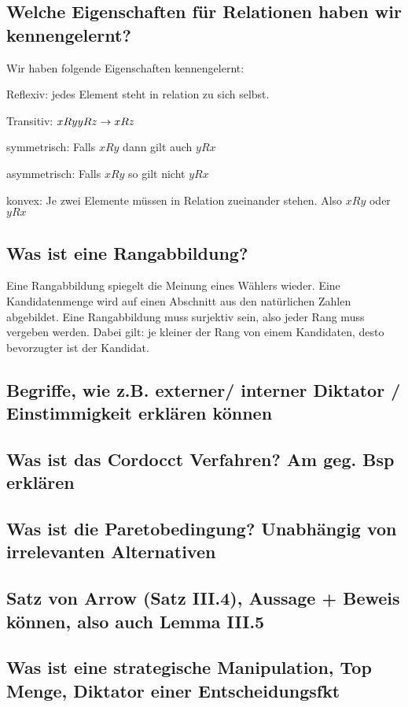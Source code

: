 \documentclass[]{article}
\begin{document}
\subsection*{Welche Eigenschaften für Relationen haben wir kennengelernt? }
Wir haben folgende Eigenschaften kennengelernt:
 
Reflexiv: jedes Element steht in relation zu sich selbst. 

Transitiv: $xRy \vspace{1ex} yRz \rightarrow xRz$

symmetrisch: Falls $xRy$ dann gilt auch $yRx$

asymmetrisch: Falls $xRy$ so gilt nicht $yRx$

konvex: Je zwei Elemente müssen in Relation zueinander stehen. Also $xRy$ oder $yRx$

\subsection*{Was ist eine Rangabbildung? }

Eine Rangabbildung spiegelt die Meinung eines Wählers wieder. Eine Kandidatenmenge wird auf einen Abschnitt aus den natürlichen Zahlen abgebildet. Eine Rangabbildung muss surjektiv sein, also jeder Rang muss vergeben werden. Dabei gilt: je kleiner der Rang von einem Kandidaten, desto bevorzugter ist der Kandidat.  

\subsection*{Begriffe, wie z.B. externer/ interner Diktator / Einstimmigkeit erklären können}

\subsection*{Was ist das Cordocct Verfahren? Am geg. Bsp erklären}

\subsection*{Was ist die Paretobedingung? Unabhängig von irrelevanten Alternativen}

\subsection*{Satz von Arrow (Satz III.4), Aussage + Beweis können, also auch Lemma III.5}

\subsection*{Was ist eine strategische Manipulation, Top Menge, Diktator einer Entscheidungsfkt}
\end{document}
